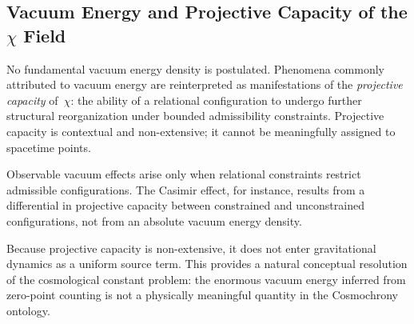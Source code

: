 \subsection{Vacuum Energy and Projective Capacity of the \texorpdfstring{$\chi$}{χ} Field}
  \label{subsec:vacuum-energy-relaxation-capacity}

  No fundamental vacuum energy density is postulated.
  Phenomena commonly attributed to vacuum energy are reinterpreted as
  manifestations of the \emph{projective capacity} of~$\chi$: the ability
  of a relational configuration to undergo further structural
  reorganization under bounded admissibility constraints.
  Projective capacity is contextual and non-extensive; it cannot be
  meaningfully assigned to spacetime points.

  Observable vacuum effects arise only when relational constraints restrict
  admissible configurations.
  The Casimir effect, for instance, results from a differential in
  projective capacity between constrained and unconstrained configurations,
  not from an absolute vacuum energy density.

  Because projective capacity is non-extensive, it does not enter
  gravitational dynamics as a uniform source term.
  This provides a natural conceptual resolution of the cosmological
  constant problem: the enormous vacuum energy inferred from zero-point
  counting is not a physically meaningful quantity in the Cosmochrony
  ontology.

